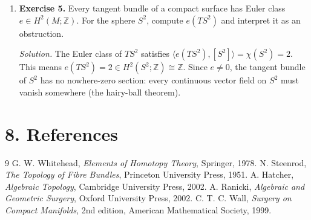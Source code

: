\begin{enumerate}[leftmargin=*,itemsep=0.9em]
\item \textbf{Exercise 5.} Every tangent bundle of a compact surface has Euler class $e\in H^2(M;\mathbb{Z})$. For the sphere $S^2$, compute $e(TS^2)$ and interpret it as an obstruction.

\emph{Solution.} The Euler class of $TS^2$ satisfies $\langle e(TS^2),[S^2]\rangle=\chi(S^2)=2$. This means $e(TS^2)=2\in H^2(S^2;\mathbb{Z})\cong\mathbb{Z}$. Since $e\neq 0$, the tangent bundle of $S^2$ has no nowhere-zero section: every continuous vector field on $S^2$ must vanish somewhere (the hairy-ball theorem).

\end{enumerate}
\section*{8. References}
\begin{thebibliography}{9}
 G. W. Whitehead, \emph{Elements of Homotopy Theory}, Springer, 1978.
 N. Steenrod, \emph{The Topology of Fibre Bundles}, Princeton University Press, 1951.
 A. Hatcher, \emph{Algebraic Topology}, Cambridge University Press, 2002.
 A. Ranicki, \emph{Algebraic and Geometric Surgery}, Oxford University Press, 2002.
 C. T. C. Wall, \emph{Surgery on Compact Manifolds}, 2nd edition, American Mathematical Society, 1999.
\end{thebibliography}
